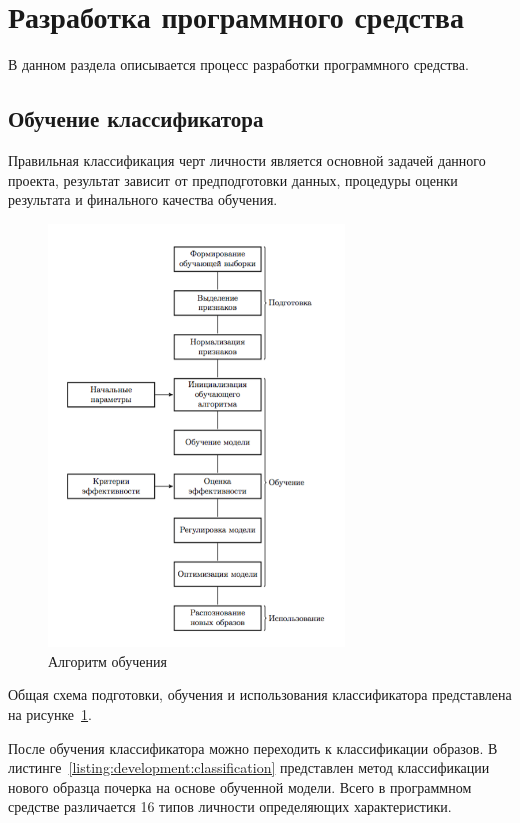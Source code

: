 \section{Разработка программного средства}

В данном раздела описывается процесс разработки программного \mbox{средства.}
\subsection{Обучение классификатора}
Правильная классификация черт личности является основной задачей данного проекта, результат зависит от предподготовки данных, процедуры оценки результата и финального качества обучения.

\begin{figure}[h]
    \centering
    \includegraphics[width=0.7\textwidth]{figures/SVM_flow.png}
    \caption{Алгоритм обучения}
    \label{fig:develoipment:svm_flow}
\end{figure}

Общая схема подготовки, обучения и использования классификатора представлена на рисунке~\ref{fig:develoipment:svm_flow}.

После обучения классификатора можно переходить к классификации образов. В листинге~\ref{listing:development:classification} представлен метод классификации нового образца почерка на основе обученной модели. Всего в программном средстве различается 16 типов личности определяющих характеристики.

